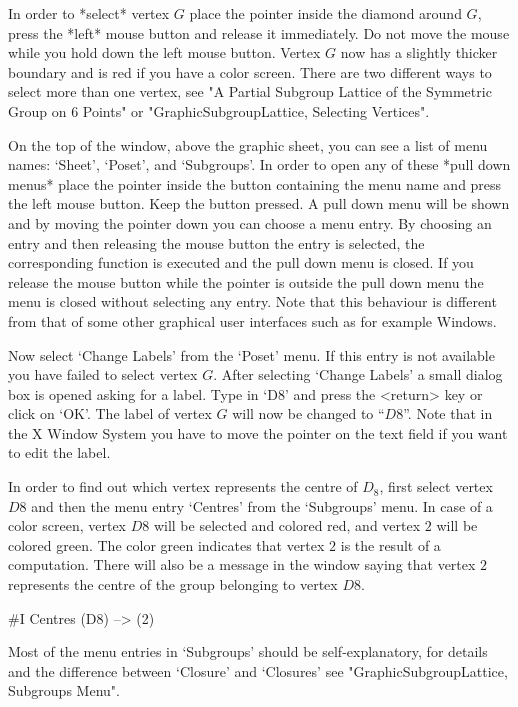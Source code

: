 In  order to *select* vertex $G$  place the pointer inside the diamond
around $G$, press the *left* mouse button  and release it immediately. 
Do  not move the  mouse  while you hold down  the  left mouse button.  
Vertex $G$ now has a slightly thicker boundary and is  red if you have
a color screen.  There are two different ways  to select more than one
vertex,  see "A Partial  Subgroup Lattice of  the Symmetric Group on 6
Points" or "GraphicSubgroupLattice, Selecting Vertices".

On the top of the window, above the graphic sheet, you  can see a list
of  menu names:  `Sheet',  `Poset', and `Subgroups'.   In order to
open  any of  these *pull down  menus*  place  the pointer inside  the
button containing the menu name and press the left mouse button.  Keep
the button pressed.  A pull down menu will  be shown and by moving the
pointer down  you can choose  a menu entry.   By choosing an entry and
then  releasing    the mouse   button the   entry    is  selected, the
corresponding function is  executed and the  pull down menu is closed. 
If you release the mouse button while the  pointer is outside the pull
down  menu the menu  is closed without selecting  any entry. Note that
this   behaviour is different from that   of some other graphical user
interfaces such as for example Windows.

Now  select `Change Labels' from the  `Poset' menu.  If this entry
is not   available  you have  failed to    select vertex  $G$.   After
selecting `Change Labels' a small dialog box is  opened asking for a
label.  Type in `D8' and press the <return> key or click on `OK'.  The
label of vertex $G$ will now be changed to ``$D8$''. Note that in the
X Window System you have to move the pointer on  the text field if you
want to edit the label.

In  order to find  out which  vertex represents the  centre  of $D_8$,
first select vertex $D8$ and then the  menu entry `Centres' from the
`Subgroups' menu.  In case of  a color screen,  vertex $D8$ will  be
selected and colored  red, and vertex $2$  will be colored green.  The
color green indicates that vertex $2$ is the result  of a computation. 
There will also be a message  in the {\GAP}  window saying that vertex
$2$ represents the centre of the group belonging to vertex $D8$.

\begintt
#I  Centres (D8) --> (2)
\endtt

Most of  the menu entries  in `Subgroups' should be self-explanatory, for
details and  the   difference   between  `Closure'  and    `Closures' see
"GraphicSubgroupLattice, Subgroups Menu".

